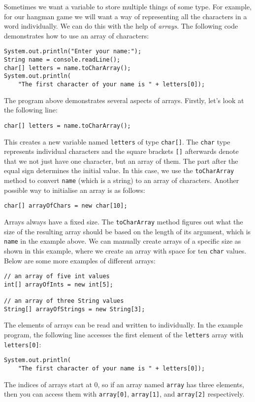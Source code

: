 Sometimes we want a variable to store multiple things of some type. For example, for our hangman game we will want a way of representing all the characters in a word individually. We can do this with the help of \emph{arrays}. The following code demonstrates how to use an array of characters:
\begin{verbatim}
System.out.println("Enter your name:");
String name = console.readLine();
char[] letters = name.toCharArray();
System.out.println(
    "The first character of your name is " + letters[0]);
\end{verbatim}
\taskLine 
{}
\taskLine 

The program above demonstrates several aspects of arrays. Firstly, let's look at the following line:
\begin{verbatim}
char[] letters = name.toCharArray();
\end{verbatim}
This creates a new variable named \texttt{letters} of type \texttt{char[]}. The \texttt{char} type represents individual characters and the square brackets \texttt{[]} afterwards denote that we not just have one character, but an array of them. The part after the equal sign determines the initial value. In this case, we use the \texttt{toCharArray} method to convert \texttt{name} (which is a string) to an array of characters. Another possible way to initialise an array is as follows:
\begin{verbatim}
char[] arrayOfChars = new char[10];
\end{verbatim}
Arrays always have a fixed size. The \texttt{toCharArray} method figures out what the size of the resulting array should be based on the length of its argument, which is \texttt{name} in the example above. We can manually create arrays of a specific size as shown in this example, where we create an array with space for ten \texttt{char} values. Below are some more examples of different arrays:
\begin{verbatim}
// an array of five int values
int[] arrayOfInts = new int[5];

// an array of three String values 
String[] arrayOfStrings = new String[3];
\end{verbatim}
The elements of arrays can be read and written to individually. In the example program, the following line accesses the first element of the \texttt{letters} array with \texttt{letters[0]}:
\begin{verbatim}
System.out.println(
    "The first character of your name is " + letters[0]);
\end{verbatim}
The indices of arrays start at 0, so if an array named \texttt{array} has three elements, then you can access them with \texttt{array[0]}, \texttt{array[1]}, and \texttt{array[2]} respectively.

